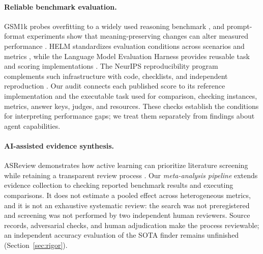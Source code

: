\paragraph{Reliable benchmark evaluation.}
GSM1k probes overfitting to a widely used reasoning benchmark \citep{zhang2024gsm1k}, and
prompt-format experiments show that meaning-preserving changes can alter measured performance
\citep{sclar2024format}. HELM standardizes evaluation conditions across scenarios and metrics
\citep{liang2023helm}, while the Language Model Evaluation Harness provides reusable task
and scoring implementations \citep{gao2023harness}. The NeurIPS reproducibility program
complements such infrastructure with code, checklists, and independent reproduction
\citep{pineau2021reproducibility}. Our audit connects each published score to its reference
implementation and the executable task used for comparison, checking instances, metrics,
answer keys, judges, and resources. These checks establish the conditions for interpreting
performance gaps; we treat them separately from findings about agent capabilities.

\paragraph{AI-assisted evidence synthesis.}
ASReview demonstrates how active learning can prioritize literature screening while retaining
a transparent review process \citep{vandeschoot2021asreview}. Our \emph{meta-analysis pipeline}
extends evidence collection to checking reported benchmark results and executing comparisons.
It does not estimate a pooled effect across heterogeneous metrics, and it is not an exhaustive
systematic review: the search was not preregistered and screening was not performed by two
independent human reviewers. Source records, adversarial checks, and human adjudication make
the process reviewable; an independent accuracy evaluation of the SOTA finder remains
unfinished (Section~\ref{sec:rigor}).

